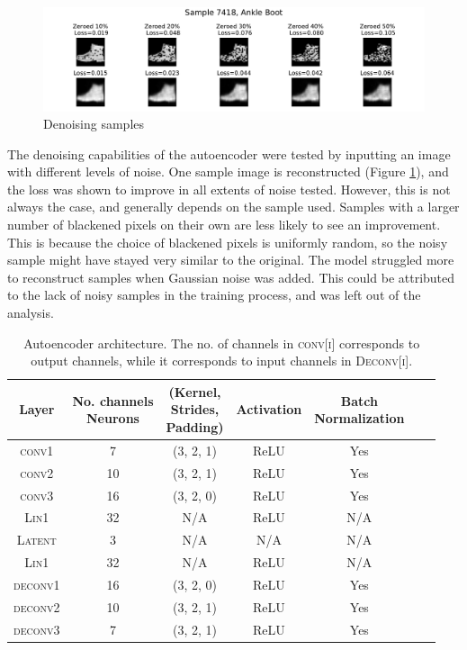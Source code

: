 \documentclass[11pt]{article} %
\begin{document}
\begin{figure}[b]
    \centering
    \includegraphics[width=\textwidth]{res/Reconstruction.pdf}
    \caption{Denoising samples}
    \label{fig:recon}
\end{figure}


\noindent The denoising capabilities of the autoencoder were tested by inputting an image with different levels of noise. One sample image is reconstructed (Figure \ref{fig:recon}), and the loss was shown to improve in all extents of noise tested. However, this is not always the case, and generally depends on the sample used. Samples with a larger number of blackened pixels on their own are less likely to see an improvement. This is because the choice of blackened pixels is uniformly random, so the noisy sample might have stayed very similar to the original. The model struggled more to reconstruct samples when Gaussian noise was added. This could be attributed to the lack of noisy samples in the training process, and was left out of the analysis.

\pagebreak

\begin{table}
\centering
    \begin{tabular}{ccccccc}
        Layer & \thead{No. channels \\ Neurons} & \thead{(Kernel,\\ Strides,\\ Padding)} & Activation & \thead{Batch \\ Normalization}\\
        \hline
        \textsc{conv1} & 7 & (3, 2, 1) & ReLU & Yes\\
        \textsc{conv2} & 10 & (3, 2, 1) & ReLU & Yes\\
        \textsc{conv3} & 16 & (3, 2, 0) & ReLU & Yes\\
        \textsc{Lin1} & 32 & N/A & ReLU & N/A \\
        \hdashline
        \textsc{Latent} & 3 & N/A & N/A & N/A \\
        \hdashline
        \textsc{Lin1} & 32 & N/A & ReLU & N/A \\
        \textsc{deconv1} & 16 & (3, 2, 0) & ReLU & Yes\\
        \textsc{deconv2} & 10 & (3, 2, 1) & ReLU & Yes\\
        \textsc{deconv3} & 7 & (3, 2, 1) & ReLU & Yes\\
    \end{tabular}
    \caption{Autoencoder architecture. The no. of channels in \textsc{conv[i]} corresponds to output channels, while it corresponds to input channels in \textsc{Deconv[i]}.}
    \label{tab:AE_params}
\end{table}
\end{document}

